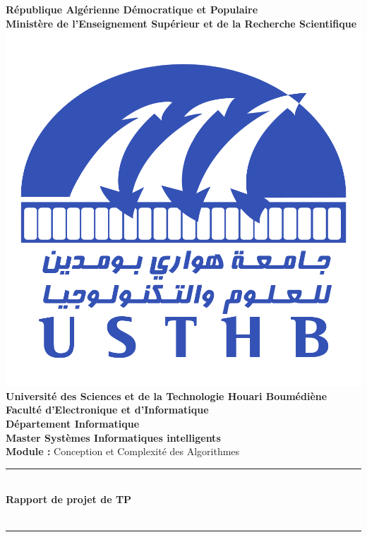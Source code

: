 \documentclass[12pt]{report}
\newcommand{\HRule}{\rule{\linewidth}{0.5mm}}
\begin{document}
    \begin{titlepage}
        \begin{center}
            \textbf{République Algérienne Démocratique et Populaire}\\
            \textbf{Ministère de l'Enseignement Supérieur et de la Recherche Scientifique}\\[1cm]
            
            \includegraphics[scale=0.5]{./ressources/USTHB_Logo.png}\\[1cm]
            
            \large
            \textbf{Université des Sciences et de la Technologie Houari Boumédiène}\\[0.5cm]
            \textbf{Faculté d'Electronique et d'Informatique}\\
            \textbf{Département Informatique}\\[0.5cm]

            \Large
            \textbf{Master Systèmes Informatiques intelligents}\\[0.5cm]
            
            \textbf{Module :} Conception et Complexité des Algorithmes

            \HRule \\[0.4cm]
            \LARGE{\textbf{Rapport de projet de TP}\\
            \textit{}\\[0.4cm]}
            \HRule \\[2cm]
            

\end{center}
\end{titlepage}
\end{document}
